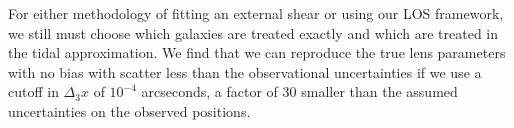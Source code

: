 For either methodology of fitting an external shear or using our LOS framework, we still must choose which galaxies are treated exactly and which are treated in the tidal approximation. We find that we can reproduce the true lens parameters with no bias with scatter less than the observational uncertainties if we use a cutoff in $\Delta_3x$ of $10^{-4}$ arcseconds, a factor of 30 smaller than the assumed uncertainties on the observed positions.
 